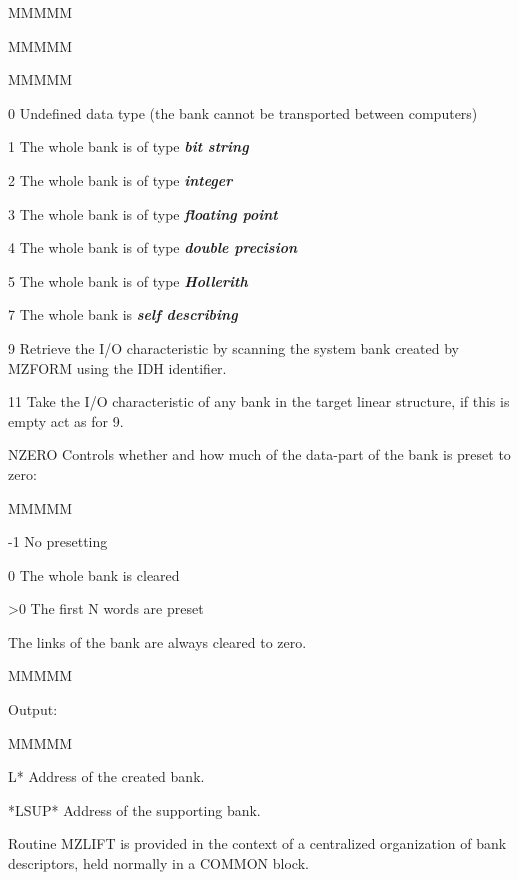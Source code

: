 \begin{DL}{MMMMM}
\begin{DL}{MMMMM}
\begin{DL}{MMMMM}
\item[ 0
]Undefined data type (the bank cannot be transported between
computers)
\item[ 1
]The whole bank is of type {\bf\it bit string}
\item[ 2
]The whole bank is of type {\bf\it integer}
\item[ 3
]The whole bank is of type {\bf\it floating point}
\item[ 4
]The whole bank is of type {\bf\it double precision}
\item[ 5
]The whole bank is of type {\bf\it Hollerith}
\item[ 7
]The whole bank is {\bf\it self describing}
\item[ 9
]Retrieve the I/O characteristic by scanning the system
bank created by MZFORM using the IDH identifier.
\item[ 11
]Take the I/O characteristic of any bank in the target
linear structure, if this is empty act as for 9.
\end{DL}
\item[NZERO
]Controls whether and how much of the data-part
of the bank is preset to zero:
\begin{DL}{MMMMM}
\item[-1
]No presetting
\item[ 0
]The whole bank is cleared
\item[>0
]The first N words are preset
\end{DL}
\newline The links of the bank are always cleared to zero.
\end{DL}
\end{DL}
\begin{DL}{MMMMM}
\item[Output:
]
\begin{DL}{MMMMM}
\item[L*
]Address of the created bank.
\item[*LSUP*
]Address of the supporting bank.
\end{DL}
\end{DL}
\par Routine
MZLIFT is provided in the context of a centralized organization
of bank descriptors, held normally in a COMMON block.
